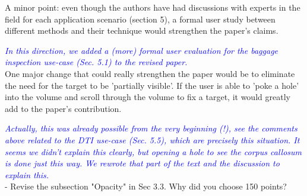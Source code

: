 \documentclass[a4paper,10pt]{article}
\newcommand{\rr}[1]{\emph{\textcolor{blue}{#1}}}
\begin{document}
    A minor point: even though the authors have had discussions with experts in the
    field for each application scenario (section 5), a formal user study between
    different methods and their technique would strengthen the paper's claims.
    
    \rr{In this direction, we added a (more) formal user evaluation for the baggage inspection use-case (Sec. 5.1) to the revised paper.}\\

    One major change that could really strengthen the paper would be to eliminate the
    need for the target to be 'partially visible'. If the user is able to 'poke a
    hole' into the volume and scroll through the volume to fix a target, it would
    greatly add to the paper's contribution.
    
    \rr{Actually, this was already possible from the very beginning (!), see the comments above related to the DTI use-case (Sec. 5.5), which are precisely this situation. It seems we didn't explain this clearly, but opening a hole to see the corpus callosum is done just this way. We rewrote that part of the text and the discussion to explain this.}\\
    
    - Revise the subsection "Opacity" in Sec 3.3. Why did you choose 150 points? 
    
\end{document}
